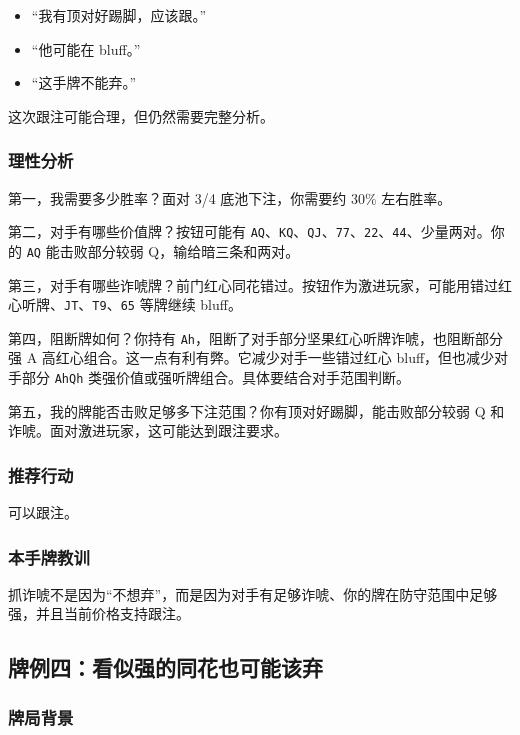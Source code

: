 \begin{itemize}
\item “我有顶对好踢脚，应该跟。”
\item “他可能在 bluff。”
\item “这手牌不能弃。”
\end{itemize}

这次跟注可能合理，但仍然需要完整分析。

\subsubsection*{理性分析}

第一，我需要多少胜率？面对 3/4 底池下注，你需要约 30\% 左右胜率。

第二，对手有哪些价值牌？按钮可能有 \texttt{AQ}、\texttt{KQ}、\texttt{QJ}、\texttt{77}、\texttt{22}、\texttt{44}、少量两对。你的 \texttt{AQ} 能击败部分较弱 Q，输给暗三条和两对。

第三，对手有哪些诈唬牌？前门红心同花错过。按钮作为激进玩家，可能用错过红心听牌、\texttt{JT}、\texttt{T9}、\texttt{65} 等牌继续 bluff。

第四，阻断牌如何？你持有 \texttt{Ah}，阻断了对手部分坚果红心听牌诈唬，也阻断部分强 A 高红心组合。这一点有利有弊。它减少对手一些错过红心 bluff，但也减少对手部分 \texttt{AhQh} 类强价值或强听牌组合。具体要结合对手范围判断。

第五，我的牌能否击败足够多下注范围？你有顶对好踢脚，能击败部分较弱 Q 和诈唬。面对激进玩家，这可能达到跟注要求。

\subsubsection*{推荐行动}

可以跟注。

\subsubsection*{本手牌教训}

抓诈唬不是因为“不想弃”，而是因为对手有足够诈唬、你的牌在防守范围中足够强，并且当前价格支持跟注。

\subsection{牌例四：看似强的同花也可能该弃}

\subsubsection*{牌局背景}

